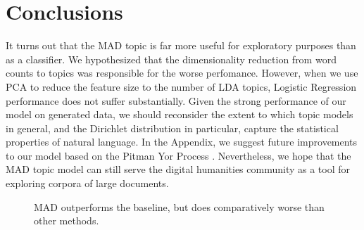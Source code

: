 \documentclass[14pt]{article} %
\theoremstyle{plain}
\theoremstyle{definition}
\theoremstyle{remark}
\begin{document}
\section{Conclusions}
 It turns out that the MAD topic is far more useful for exploratory purposes than as a classifier. We hypothesized that the dimensionality reduction from word counts to topics was responsible for the worse perfomance. However, when we use PCA to reduce the feature size to the number of LDA topics, Logistic Regression performance does not suffer substantially. Given the strong performance of our model on generated data, we should reconsider the extent to which topic models in general, and the Dirichlet distribution in particular, capture the statistical properties of natural language. In the Appendix, we suggest future improvements to our model based on the Pitman Yor Process \cite{teh2006hierarchical}. Nevertheless, we hope that the MAD topic model can still serve the digital humanities community as a tool for exploring corpora of large documents.

\newpage

\begin{figure}
\centering
{}
\caption{MAD outperforms the baseline, but does comparatively worse than other methods.}
\label{fig:results}
\end{figure}
\end{document}
